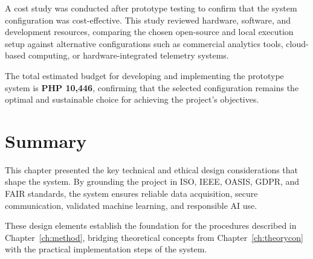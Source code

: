 \begin{table}[h!]
\centering
\caption{Alternative Software Designs Evaluated for the Prototype}
\label{tab:alt_software}
\end{table}

A cost study was conducted after prototype testing to confirm that the system configuration was cost-effective. This study reviewed hardware, software, and development resources, comparing the chosen open-source and local execution setup against alternative configurations such as commercial analytics tools, cloud-based computing, or hardware-integrated telemetry systems. 

The total estimated budget for developing and implementing the prototype system is \textbf{PHP 10,446}, confirming that the selected configuration remains the optimal and sustainable choice for achieving the project’s objectives.


\section{Summary}
\label{sec:summary}

This chapter presented the key technical and ethical design considerations that shape the system. By grounding the project in ISO, IEEE, OASIS, GDPR, and FAIR standards, the system ensures reliable data acquisition, secure communication, validated machine learning, and responsible AI use.

These design elements establish the foundation for the procedures described in Chapter~\ref{ch:method}, bridging theoretical concepts from Chapter~\ref{ch:theorycon} with the practical implementation steps of the system.
